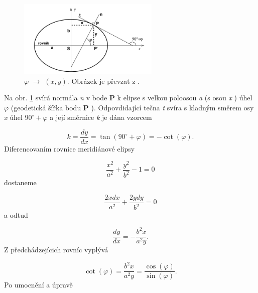 \documentclass[11pt,a4paper]{article}
\begin{document}

\begin{figure}[ht!]
\begin{center}

\includegraphics[width=0.60\textwidth]{FIG/CimbalnikObr1-14}
\caption{$\varphi$ $\rightarrow$ $\left(x, y\right)$. Obrázek je převzat z \cite{Cimbalnik1997}.}
\label{fig:cim114}
\end{center}
\end{figure}

Na obr. \ref{fig:cim114} svírá normála \textit{n} v bode \textbf{P} k elipse s 
velkou poloosou \textit{a} (s osou \textit{x} ) úhel $\varphi$ (geodetická šířka 
bodu \textbf{P} ). Odpovdidající tečna \textit{t} svíra s kladným směrem osy 
\textit{x} úhel $90^{\circ} + \varphi$ a její směrnice \textit{k} je dána vzorcem

\begin{equation}
k = \dfrac{dy}{dx} = \tan{\left(90^{\circ} + \varphi\right)} = -\cot{\left(\varphi\right)}.
\end{equation}
Diferencovaním rovnice meridiánové elipsy

\begin{equation}
\dfrac{x^{2}}{a^{2}} + \dfrac{y^{2}}{b^{2}} -1 = 0
\end{equation}
dostaneme

\begin{equation}
\dfrac{2xdx}{a^{2}} + \dfrac{2ydy}{b^{2}} = 0
\end{equation}
a odtud

\begin{equation}
\dfrac{dy}{dx} = - \dfrac{b^{2}x}{a^{2}y}.
\end{equation}
Z předchádzejícich rovníc vyplývá

\begin{equation}
\cot{\left(\varphi\right)} = \dfrac{b^{2}x}{a^{2}y} = \dfrac{\cos{\left(\varphi\right)}}{\sin{\left(\varphi\right)}}.
\end{equation}
Po umocnění a úpravě
\end{document}
